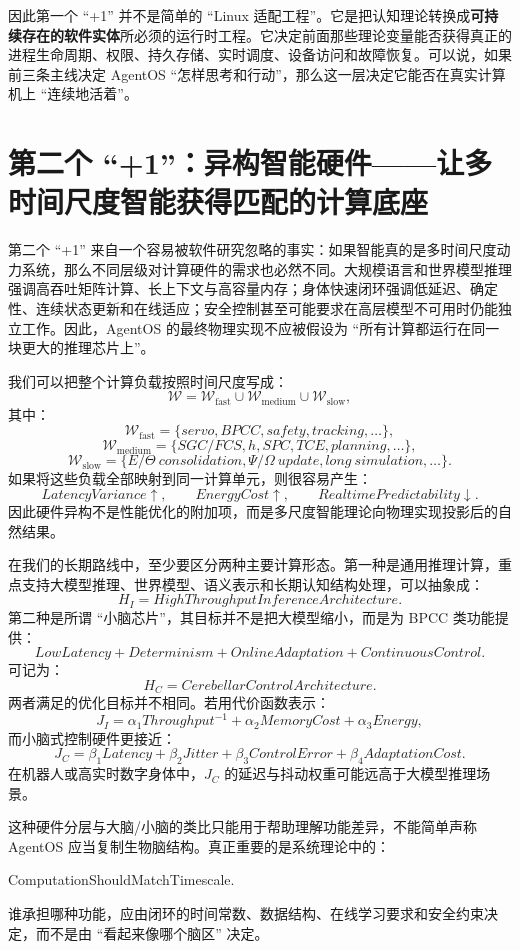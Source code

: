 因此第一个 ``+1'' 并不是简单的 ``Linux 适配工程''。它是把认知理论转换成\textbf{可持续存在的软件实体}所必须的运行时工程。它决定前面那些理论变量能否获得真正的进程生命周期、权限、持久存储、实时调度、设备访问和故障恢复。可以说，如果前三条主线决定 AgentOS ``怎样思考和行动''，那么这一层决定它能否在真实计算机上 ``连续地活着''。

\section{第二个 ``+1''：异构智能硬件——让多时间尺度智能获得匹配的计算底座}
\label{sec:roadmap-hardware}

第二个 ``+1'' 来自一个容易被软件研究忽略的事实：如果智能真的是多时间尺度动力系统，那么不同层级对计算硬件的需求也必然不同。大规模语言和世界模型推理强调高吞吐矩阵计算、长上下文与高容量内存；身体快速闭环强调低延迟、确定性、连续状态更新和在线适应；安全控制甚至可能要求在高层模型不可用时仍能独立工作。因此，AgentOS 的最终物理实现不应被假设为 ``所有计算都运行在同一块更大的推理芯片上''。

我们可以把整个计算负载按照时间尺度写成：
\[
\mathcal W
=
\mathcal W_{\mathrm{fast}}
\cup
\mathcal W_{\mathrm{medium}}
\cup
\mathcal W_{\mathrm{slow}},
\]
其中：
\[
\mathcal W_{\mathrm{fast}}
=
\{servo,BPCC,safety,tracking,\ldots\},
\]
\[
\mathcal W_{\mathrm{medium}}
=
\{SGC/FCS,h,SPC,TCE,planning,\ldots\},
\]
\[
\mathcal W_{\mathrm{slow}}
=
\{E/\Theta\ consolidation,\Psi/\Omega\ update,long\ simulation,\ldots\}.
\]
如果将这些负载全部映射到同一计算单元，则很容易产生：
\[
LatencyVariance\uparrow,
\qquad
EnergyCost\uparrow,
\qquad
RealtimePredictability\downarrow.
\]
因此硬件异构不是性能优化的附加项，而是多尺度智能理论向物理实现投影后的自然结果。

在我们的长期路线中，至少要区分两种主要计算形态。第一种是通用推理计算，重点支持大模型推理、世界模型、语义表示和长期认知结构处理，可以抽象成：
\[
H_I
=
HighThroughputInferenceArchitecture.
\]
第二种是所谓 ``小脑芯片''，其目标并不是把大模型缩小，而是为 BPCC 类功能提供：
\[
\boxed{
LowLatency
+
Determinism
+
OnlineAdaptation
+
ContinuousControl.
}
\]
可记为：
\[
H_C
=
CerebellarControlArchitecture.
\]
两者满足的优化目标并不相同。若用代价函数表示：
\[
J_I
=
\alpha_1 Throughput^{-1}
+
\alpha_2 MemoryCost
+
\alpha_3 Energy,
\]
而小脑式控制硬件更接近：
\[
J_C
=
\beta_1 Latency
+
\beta_2 Jitter
+
\beta_3 ControlError
+
\beta_4 AdaptationCost.
\]
在机器人或高实时数字身体中，$J_C$ 的延迟与抖动权重可能远高于大模型推理场景。

这种硬件分层与大脑/小脑的类比只能用于帮助理解功能差异，不能简单声称 AgentOS 应当复制生物脑结构。真正重要的是系统理论中的：
\begin{statementbox}
ComputationShouldMatchTimescale.
\end{statementbox}
谁承担哪种功能，应由闭环的时间常数、数据结构、在线学习要求和安全约束决定，而不是由 ``看起来像哪个脑区'' 决定。

